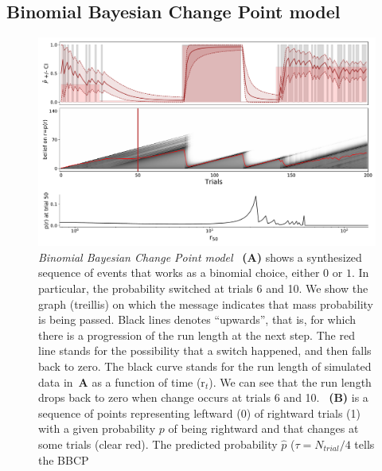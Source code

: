 \documentclass[12pt,english]{article}%
\newcommand{\seeFig}[1]{Figure~\ref{fig:#1}}
\newcommand{\AM}[1]{\textbf{\textcolor{blue}{[AM: #1]}}}
\begin{document}
\subsection{Binomial Bayesian Change Point model}
\begin{figure}%
\begin{center}
\includegraphics[width=1\linewidth]{3_BCP_readouts}
\end{center}
\caption{\emph{Binomial Bayesian Change Point model}
~\textbf{(A)} shows a synthesized sequence of events that works as a binomial choice, either $0$ or $1$. 
In particular, the probability switched at trials 6 and 10. 
We show the graph (treillis) on which the message indicates that 
mass probability is being passed. 
Black lines denotes ``upwards'', 
that is, for which there is a progression of the run length at the next step. 
The red line stands for the possibility that a switch happened, 
and then falls back to zero. 
The black curve stands for 
the run length of simulated data in~\textbf{A} 
as a function of time (r$_t$). 
We can see that 
the run length drops back to zero 
when change occurs at trials 6 and 10.
~\textbf{(B)} is a sequence of points representing 
leftward (0) of rightward trials (1) 
with a given probability $p$ of being rightward and 
that changes at some trials (clear red). 
The predicted probability $\hat{p}$ ($\tau=N_{trial}/4$ tells the BBCP 
}
\end{figure}
\end{document}
